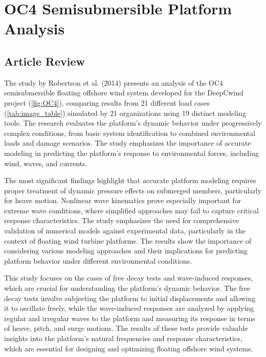 \documentclass[a4paper]{article}
\begin{document}
\section{OC4 Semisubmersible Platform Analysis}
\subsection{Article Review}
\hspace*{0.5cm}The study by Robertson et al. (2014) presents an analysis of the OC4 semisubmersible floating offshore wind system developed for the DeepCwind project (\autoref{fig:OC4}), comparing results from 21 different load cases (\autoref{tab:image_table}) simulated by 21 organizations using 19 distinct modeling tools. The research evaluates the platform’s dynamic behavior under progressively complex conditions, from basic system identification to combined environmental loads and damage scenarios. The study emphasizes the importance of accurate modeling in predicting the platform's response to environmental forces, including wind, waves, and currents. 

The most significant findings highlight that accurate platform modeling requires proper treatment of dynamic pressure effects on submerged members, particularly for heave motion. Nonlinear wave kinematics prove especially important for extreme wave conditions, where simplified approaches may fail to capture critical response characteristics.
The study emphasizes the need for comprehensive validation of numerical models against experimental data, particularly in the context of floating wind turbine platforms. The results show the importance of considering various modeling approaches and their implications for predicting platform behavior under different environmental conditions.

This study focuses on the cases of free decay tests and wave-induced responses, which are crucial for understanding the platform's dynamic behavior. The free decay tests involve subjecting the platform to initial displacements and allowing it to oscillate freely, while the wave-induced responses are analyzed by applying regular and irregular waves to the platform and measuring its response in terms of heave, pitch, and surge motions.
The results of these tests provide valuable insights into the platform's natural frequencies and response characteristics, which are essential for designing and optimizing floating offshore wind systems.
\vspace{0.5cm}
\end{document}

